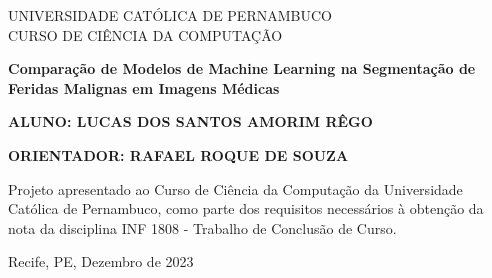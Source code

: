 %
%

\begin{titlepage}

\begin{center}
\small


\begin{center}
\textsf{\textsc{UNIVERSIDADE CATÓLICA DE PERNAMBUCO \\
CURSO DE CIÊNCIA DA COMPUTAÇÃO}}
\end{center}




\vfill

\LARGE
\begin{center}
\textbf{  
} \textbf{Comparação de Modelos de Machine Learning na Segmentação de Feridas Malignas em Imagens Médicas}
\end{center}

\vfill

\Large



\vfill

\normalsize
\hfill
\parbox{0.70\linewidth}{\textbf{ALUNO: LUCAS DOS SANTOS AMORIM RÊGO} 

\textbf{ORIENTADOR: RAFAEL ROQUE DE SOUZA} 
}


\vfill

\hfill
\parbox{0.70\linewidth}{
Projeto apresentado ao Curso de Ciência
da Computação da Universidade Católica
de Pernambuco, como parte dos
requisitos necessários à obtenção da
nota da disciplina INF 1808 - Trabalho de
Conclusão de Curso.
}



\vfill

\large

\begin{center}
Recife, PE, Dezembro de 2023
\end{center}

\end{center}

\end{titlepage}
